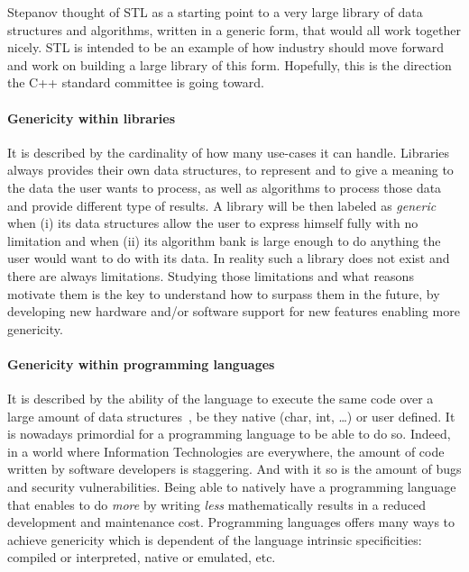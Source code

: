 Stepanov thought of STL as a starting point to a very large library of data structures and algorithms, written in a
generic form, that would all work together nicely. STL is intended to be an example of how industry should move forward
and work on building a large library of this form. Hopefully, this is the direction the C++ standard committee is going
toward.

\paragraph{Genericity within libraries} It is described by the cardinality of how many use-cases it can handle.
Libraries always provides their own data structures, to represent and to give a meaning to the data the user wants to
process, as well as algorithms to process those data and provide different type of results. A library will be then
labeled as \emph{generic}~\parencite{musser.1994.algorithm} when (i) its data structures allow the user to express
himself fully with no limitation and when (ii) its algorithm bank is large enough to do anything the user would want to
do with its data. In reality such a library does not exist and there are always limitations. Studying those limitations
and what reasons motivate them is the key to understand how to surpass them in the future, by developing new hardware
and/or software support for new features enabling more genericity.

\paragraph{Genericity within programming languages} It is described by the ability of the language to execute the same
code over a large amount of data structures~\parencite{dehnert.1998.fundamentals}, be they native (char, int, \ldots) or
user defined. It is nowadays primordial for a programming language to be able to do so. Indeed, in a world where
Information Technologies are everywhere, the amount of code written by software developers is staggering. And with it so
is the amount of bugs and security vulnerabilities. Being able to natively have a programming language that enables to
do \emph{more} by writing \emph{less} mathematically results in a reduced development and maintenance cost. Programming
languages offers many ways to achieve genericity which is dependent of the language intrinsic specificities: compiled or
interpreted, native or emulated, etc.

